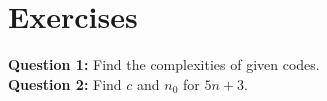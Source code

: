 \documentclass[12pt,a4paper]{article}
\begin{document}
\section{Exercises}
\noindent\textbf{Question 1:} Find the complexities of given codes.\\[0.2cm]
\noindent\textbf{Question 2:} Find $c$ and $n_0$ for $5n+3$.
%
%
\end{document}
